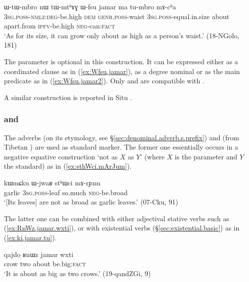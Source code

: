 \begin{exe}
\ex \label{ex:Wfsu.jamar2}
\gll ɯ-tɯ-mbro nɯ tɯ-mtʰɤɣ ɯ-fsu jamar ma tu-mbro mɤ-cʰa \\
\textsc{3sg}.\textsc{poss}-\textsc{nmlz}:\textsc{deg}-be.high \textsc{dem} \textsc{genr}.\textsc{poss}-waist \textsc{3sg}.\textsc{poss}-equal.in.size about apart.from \textsc{ipfv}-be.high \textsc{neg}-can:\textsc{fact} \\
\glt `As for its size, it can grow only about as high as a person's waist.' (18-NGolo, 181)
\end{exe}

The parameter is optional in this construction. It can be expressed either as a coordinated clause as in (\ref{ex:Wfsu.jamar}), as a degree nominal or as the main predicate as in (\ref{ex:Wfsu.jamar2}). Only  and  are compatible with .

A similar construction is reported in Situ \citep[377]{linxr93jiarong}.

 
\subsubsection{ and } \label{sec:sthWci.equative}
The adverbs  (on its etymology, see §\ref{sec:denominal.adverb.s.prefix}) and   (from Tibetan ) are used as standard marker. The former one  essentially occurs in a negative equative construction `not as $X$ as $Y$' (where $X$ is the parameter and $Y$ the standard) as in (\ref{ex:sthWci.mArJum}).

\begin{exe}
\ex \label{ex:sthWci.mArJum}
\gll kɯmɕku ɯ-jwaʁ stʰɯci mɤ-rɟum \\
garlic \textsc{3sg}.\textsc{poss}-leaf so.much \textsc{neg}-be.broad \\
\glt `[Its leaves] are not as broad as garlic leaves.' (07-Cku, 91)
\end{exe}

The latter one   can be combined with either adjectival stative verbs such as  (\ref{ex:RnWz.jamar.wxti}), or with existential verbs (§\ref{sec:existential.basic}) as in (\ref{ex:ki.jamar.tu}).
 
\begin{exe}
\ex \label{ex:RnWz.jamar.wxti}
\gll qajdo ʁnɯz jamar wxti \\
crow two about be.big:\textsc{fact} \\
\glt `It is about as big as two crows.' (19-qandZGi, 9)
\end{exe}


